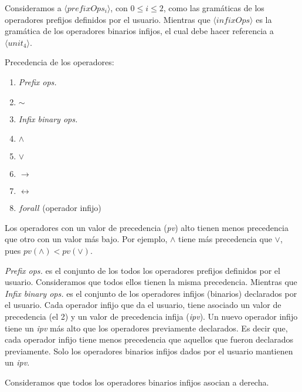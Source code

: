 \documentclass[a4paper,11pt]{article}
\theoremstyle{definition}
\begin{document}
Consideramos a $\langle prefixOps_{i} \rangle$, con $0 \leq i \leq 2$, como las gramáticas de los operadores prefijos definidos por el usuario.
Mientras que $\langle infixOps \rangle$ es la gramática de los operadores binarios infijos, el cual debe hacer referencia a $\langle unit_{4} \rangle$.

Precedencia de los operadores:
\begin{enumerate}
  \item \textit{Prefix ops.}
  \item $\sim$
  \item \textit{Infix binary ops.}
  \item $\wedge$
  \item $\vee$
  \item $\rightarrow$
  \item $\leftrightarrow$
  \item $forall$ (operador infijo)
\end{enumerate}

Los operadores con un valor de precedencia (\textit{pv}) alto tienen menos precedencia que otro con un valor más bajo.
Por ejemplo, $\wedge$ tiene más precedencia que $\vee$, pues $pv (\wedge) < pv (\vee)$.

\textit{Prefix ops.} es el conjunto de los todos los operadores prefijos definidos por el usuario. Consideramos
que todos ellos tienen la misma precedencia.
Mientras que \textit{Infix binary ops.} es el conjunto de los operadores infijos (binarios) declarados por el usuario.
Cada operador infijo que da el usuario, tiene asociado un valor de precedencia (el 2) y un valor de precedencia infija (\textit{ipv}).
Un nuevo operador infijo tiene un \textit{ipv} más alto que los operadores previamente declarados.
Es decir que, cada operador infijo tiene menos precedencia que aquellos que fueron declarados previamente.
Solo los operadores binarios infijos dados por el usuario mantienen un \textit{ipv}.

Consideramos que todos los operadores binarios infijos asocian a derecha.
\end{document}
